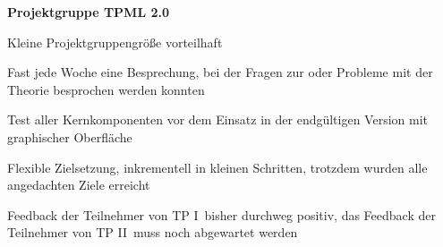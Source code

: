 {
  \textbf{Projektgruppe \glqq TPML 2.0\grqq}
  \begin{itemgroup}{}
    \item Kleine Projektgruppengröße vorteilhaft
    \item Fast jede Woche eine Besprechung, bei der Fragen zur oder Probleme
          mit der Theorie besprochen werden konnten
    \item Test aller Kernkomponenten vor dem Einsatz in der endgültigen Version
          mit graphischer Oberfläche
    \item Flexible Zielsetzung, inkrementell in kleinen Schritten, trotzdem wurden
          alle angedachten Ziele erreicht
    \item Feedback der Teilnehmer von \glqq TP I\grqq\ bisher durchweg positiv,
          das Feedback der Teilnehmer von \glqq TP II\grqq\ muss noch abgewartet werden
  \end{itemgroup}
}